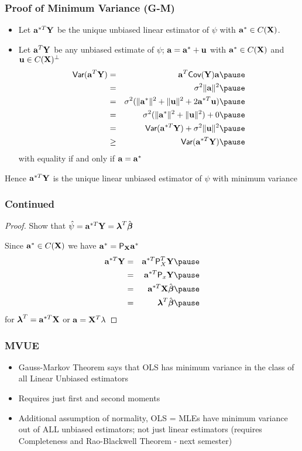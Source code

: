 \documentclass[handout]{beamer}
\begin{document}
\begin{frame} \frametitle{Proof of Minimum Variance (G-M)}
 \begin{block}{}
   \begin{itemize}
    \item
    Let $\mathbf{a}^{*T}\mathbf{Y}$ be the unique unbiased linear estimator of $\psi$
    with $\mathbf{a}^* \in C(\mathbf{X})$. \pause
\item Let $\mathbf{a}^T\mathbf{Y}$ be any unbiased estimate of $\psi$; $\mathbf{a} = \mathbf{a}^* +
  \mathbf{u}$ with $\mathbf{a}^* \in C(\mathbf{X})$ and $\mathbf{u} \in C(\mathbf{X})^\perp$ \pause
  \begin{eqnarray*}
    \Var(\a^T\Y) & = & \a^T\Cov(\Y)\a  \pause\\
 & = & \sigma^2 \| \a \|^2  \pause \\
& = & \sigma^2 (\| \a^* \|^2 + \|\u\|^2 + 2 \a^{*T} \u) \pause\\
& = & \sigma^2 (\| \a^* \|^2 + \|\u\|^2) + 0 \pause\\
& = & \Var(\a^{*T}\Y) + \sigma^2 \|\u\|^2 \pause \\
& \geq & \Var(\a^{*T}\Y) \pause
  \end{eqnarray*}
with equality if and only if $\mathbf{a} = \mathbf{a}^*$ \pause
\end{itemize}
Hence $\mathbf{a}^{*T}\mathbf{Y}$ is the unique linear unbiased estimator of $\psi$
with minimum variance 
  \end{block}
\end{frame}
\begin{frame}
  \frametitle{Continued}
  \begin{proof}
  Show that $\hat{\psi} = \mathbf{a}^{*T}\mathbf{Y} = \boldsymbol{\lambda}^T\hat{\boldsymbol{\beta}}$ \pause

  Since $\mathbf{a}^* \in C(\mathbf{X})$ we have $\mathbf{a}^*  =  \textsf{P}_{\mathbf{X}} \mathbf{a}^*$  \pause
    \begin{eqnarray*}
\a^{*T}\Y & = &  \a^{*T} \P_X^T \Y \pause \\
         & = & \a^{*T}\P_x\Y \pause \\
         & = & \a^{*T} \X \bhat \pause \\
         & = & \lambdab^T \bhat  \pause
    \end{eqnarray*}
for $\boldsymbol{\lambda}^T = \mathbf{a}^{*T}\mathbf{X}$  or $\mathbf{a} = \mathbf{X}^T\lambda$
  \end{proof}
\end{frame}
\begin{frame}
  \frametitle{MVUE}
  \begin{itemize}
  \item Gauss-Markov Theorem says that OLS has minimum variance in the
    class of all Linear Unbiased estimators \pause
\item Requires just first and second moments \pause
\item Additional assumption of normality,  OLS = MLEs have
  minimum variance out of \alert<3>{ALL}  unbiased estimators; not
  just linear estimators \pause (requires Completeness and
Rao-Blackwell Theorem - next semester) \pause
  \end{itemize}

\end{frame}
\end{document}

